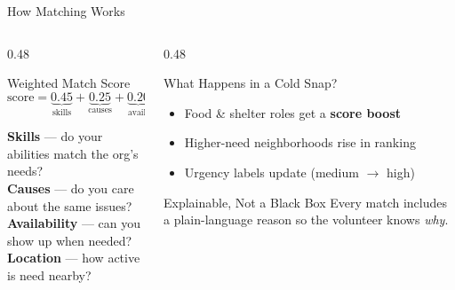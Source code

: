\documentclass[aspectratio=169, 12pt]{beamer}
\begin{document}
\begin{frame}{How Matching Works}
  \begin{columns}[T]
    \begin{column}{0.48\textwidth}
      \begin{block}{Weighted Match Score}
        \vspace{0.05cm}
        \[
          \text{score} = \underbrace{0.45}_{\text{skills}} + \underbrace{0.25}_{\text{causes}} + \underbrace{0.20}_{\text{avail.}} + \underbrace{0.10}_{\text{location}}
        \]
        \vspace{-0.15cm}
      \end{block}
      \vspace{0.1cm}
      {\small
      \textbf{Skills} --- do your abilities match the org's needs?\\[0.06cm]
      \textbf{Causes} --- do you care about the same issues?\\[0.06cm]
      \textbf{Availability} --- can you show up when needed?\\[0.06cm]
      \textbf{Location} --- how active is need nearby?
      }
    \end{column}
    \begin{column}{0.48\textwidth}
      \begin{block}{What Happens in a Cold Snap?}
        \begin{itemize}\setlength\itemsep{0pt}
          \item {\small Food \& shelter roles get a \textbf{score boost}}
          \item {\small Higher-need neighborhoods rise in ranking}
          \item {\small Urgency labels update (medium $\rightarrow$ high)}
        \end{itemize}
      \end{block}
      \vspace{0.1cm}
      \begin{alertblock}{Explainable, Not a Black Box}
        {\small Every match includes a plain-language reason so the volunteer knows \emph{why}.}
      \end{alertblock}
    \end{column}
  \end{columns}
\end{frame}
\end{document}
